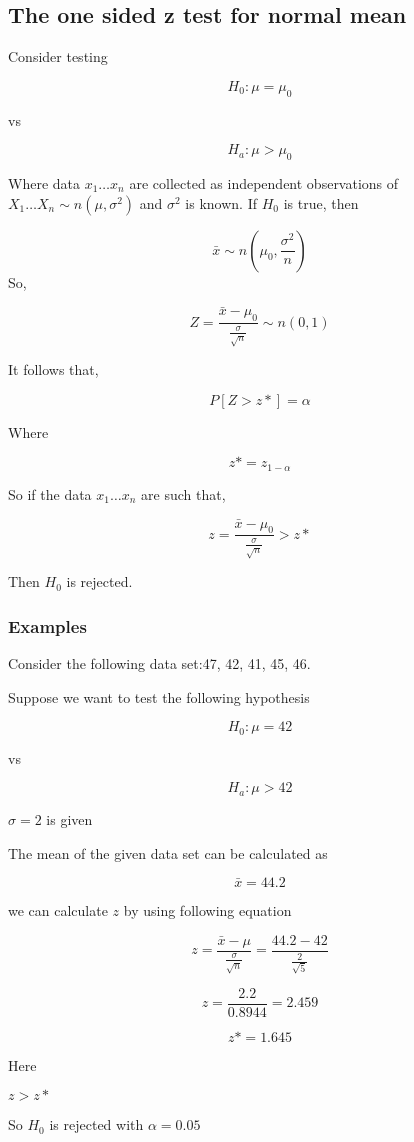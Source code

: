 \documentclass[12pt,a4paper]{article}
\theoremstyle{regla}
\theoremstyle{remark}
\theoremstyle{definition}
\theoremstyle{nonumberbreak}
\begin{document}
\subsection{The one sided z test for normal mean}
\begin{fbox}
\begin{minipage}{0.97\textwidth}
Consider testing

$$ H_0: \mu = \mu_0$$

vs

$$ H_a: \mu > \mu_0$$

 

Where data $x_1 \ldots x_n$ are collected as independent observations of $X_1 \ldots X_n \sim n(\mu, \sigma^2)$ and $\sigma^2$ is known. If $H_0$ is true, then

$$ \bar {x} \sim n (\mu_0, \frac{\sigma^2}{n})$$
So, 

$$Z = \frac{\bar {x} - \mu_0}{\frac{\sigma} {\sqrt{n}}} \sim n (0,1)$$

It follows that,

$$P[Z>z*] = \alpha$$

Where 

$$z* = z_{1-\alpha}$$

So if the data $x_1 \ldots x_n$ are such that,


$$z = \frac{\bar {x} - \mu_0}{\frac{\sigma} {\sqrt{n}}}  > z*$$

Then $H_0 $ is rejected.


\end{minipage}
\end{fbox}
\subsubsection{Examples}
\begin{xmpl}

Consider the following data set:47, 42, 41, 45, 46.

Suppose we want to test the following hypothesis

$$H_0 : \mu = 42 $$

vs

$$H_a : \mu > 42 $$

 $\sigma = 2$ is given

The mean of the given data set can be calculated as

$$\bar {x} = 44.2$$

we can calculate $z$ by using following equation

$$z = \frac{\bar {x} - \mu}{\frac{\sigma} {\sqrt{n}}} = \frac{44.2 - 42}{\frac{2} {\sqrt{5}}} $$

$$z = \frac{2.2}{0.8944} = 2.459$$

$$z* = 1.645$$

Here

 $z> z*$ 

So $ H_0$ is rejected with $\alpha = 0.05$
\end{xmpl}
\end{document}
